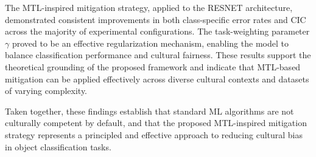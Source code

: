 The MTL-inspired mitigation strategy, applied to the RESNET architecture, demonstrated consistent improvements in both class-specific error rates and CIC across the majority of experimental configurations. The task-weighting parameter $\gamma$ proved to be an effective regularization mechanism, enabling the model to balance classification performance and cultural fairness. These results support the theoretical grounding of the proposed framework and indicate that MTL-based mitigation can be applied effectively across diverse cultural contexts and datasets of varying complexity.

Taken together, these findings establish that standard ML algorithms are not culturally competent by default, and that the proposed MTL-inspired mitigation strategy represents a principled and effective approach to reducing cultural bias in object classification tasks.